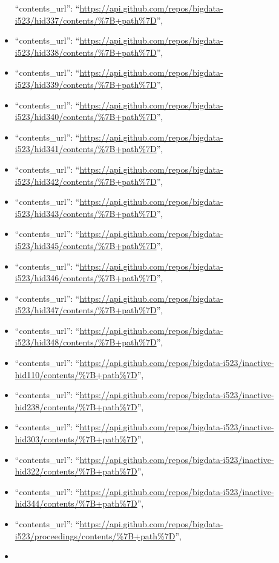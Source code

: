 \begin{itemize}
  ``contents\_url'':
  ``\url{https://api.github.com/repos/bigdata-i523/hid337/contents/\%7B+path\%7D}'',
\item
  ``contents\_url'':
  ``\url{https://api.github.com/repos/bigdata-i523/hid338/contents/\%7B+path\%7D}'',
\item
  ``contents\_url'':
  ``\url{https://api.github.com/repos/bigdata-i523/hid339/contents/\%7B+path\%7D}'',
\item
  ``contents\_url'':
  ``\url{https://api.github.com/repos/bigdata-i523/hid340/contents/\%7B+path\%7D}'',
\item
  ``contents\_url'':
  ``\url{https://api.github.com/repos/bigdata-i523/hid341/contents/\%7B+path\%7D}'',
\item
  ``contents\_url'':
  ``\url{https://api.github.com/repos/bigdata-i523/hid342/contents/\%7B+path\%7D}'',
\item
  ``contents\_url'':
  ``\url{https://api.github.com/repos/bigdata-i523/hid343/contents/\%7B+path\%7D}'',
\item
  ``contents\_url'':
  ``\url{https://api.github.com/repos/bigdata-i523/hid345/contents/\%7B+path\%7D}'',
\item
  ``contents\_url'':
  ``\url{https://api.github.com/repos/bigdata-i523/hid346/contents/\%7B+path\%7D}'',
\item
  ``contents\_url'':
  ``\url{https://api.github.com/repos/bigdata-i523/hid347/contents/\%7B+path\%7D}'',
\item
  ``contents\_url'':
  ``\url{https://api.github.com/repos/bigdata-i523/hid348/contents/\%7B+path\%7D}'',
\item
  ``contents\_url'':
  ``\url{https://api.github.com/repos/bigdata-i523/inactive-hid110/contents/\%7B+path\%7D}'',
\item
  ``contents\_url'':
  ``\url{https://api.github.com/repos/bigdata-i523/inactive-hid238/contents/\%7B+path\%7D}'',
\item
  ``contents\_url'':
  ``\url{https://api.github.com/repos/bigdata-i523/inactive-hid303/contents/\%7B+path\%7D}'',
\item
  ``contents\_url'':
  ``\url{https://api.github.com/repos/bigdata-i523/inactive-hid322/contents/\%7B+path\%7D}'',
\item
  ``contents\_url'':
  ``\url{https://api.github.com/repos/bigdata-i523/inactive-hid344/contents/\%7B+path\%7D}'',
\item
  ``contents\_url'':
  ``\url{https://api.github.com/repos/bigdata-i523/proceedings/contents/\%7B+path\%7D}'',
\item

\end{itemize}
